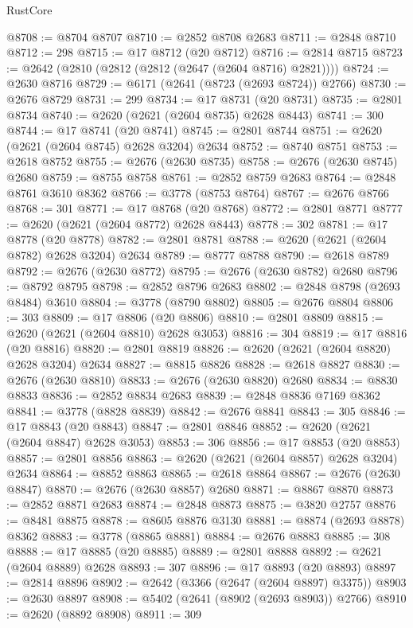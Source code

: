 \begin{lexlean}{RustCore}
\begin{coremodule}
@8708 := @8704 @8707
@8710 := @2852 @8708 @2683
@8711 := @2848 @8710
@8712 := 298
@8715 := @17 @8712 (@20 @8712)
@8716 := @2814 @8715
@8723 := @2642 (@2810 (@2812 (@2812 (@2647 (@2604 @8716) @2821))))
@8724 := @2630 @8716
@8729 := @6171 (@2641 (@8723 (@2693 @8724)) @2766)
@8730 := @2676 @8729
@8731 := 299
@8734 := @17 @8731 (@20 @8731)
@8735 := @2801 @8734
@8740 := @2620 (@2621 (@2604 @8735) @2628 @8443)
@8741 := 300
@8744 := @17 @8741 (@20 @8741)
@8745 := @2801 @8744
@8751 := @2620 (@2621 (@2604 @8745) @2628 @3204) @2634
@8752 := @8740 @8751
@8753 := @2618 @8752
@8755 := @2676 (@2630 @8735)
@8758 := @2676 (@2630 @8745) @2680
@8759 := @8755 @8758
@8761 := @2852 @8759 @2683
@8764 := @2848 @8761 @3610 @8362
@8766 := @3778 (@8753 @8764)
@8767 := @2676 @8766
@8768 := 301
@8771 := @17 @8768 (@20 @8768)
@8772 := @2801 @8771
@8777 := @2620 (@2621 (@2604 @8772) @2628 @8443)
@8778 := 302
@8781 := @17 @8778 (@20 @8778)
@8782 := @2801 @8781
@8788 := @2620 (@2621 (@2604 @8782) @2628 @3204) @2634
@8789 := @8777 @8788
@8790 := @2618 @8789
@8792 := @2676 (@2630 @8772)
@8795 := @2676 (@2630 @8782) @2680
@8796 := @8792 @8795
@8798 := @2852 @8796 @2683
@8802 := @2848 @8798 (@2693 @8484) @3610
@8804 := @3778 (@8790 @8802)
@8805 := @2676 @8804
@8806 := 303
@8809 := @17 @8806 (@20 @8806)
@8810 := @2801 @8809
@8815 := @2620 (@2621 (@2604 @8810) @2628 @3053)
@8816 := 304
@8819 := @17 @8816 (@20 @8816)
@8820 := @2801 @8819
@8826 := @2620 (@2621 (@2604 @8820) @2628 @3204) @2634
@8827 := @8815 @8826
@8828 := @2618 @8827
@8830 := @2676 (@2630 @8810)
@8833 := @2676 (@2630 @8820) @2680
@8834 := @8830 @8833
@8836 := @2852 @8834 @2683
@8839 := @2848 @8836 @7169 @8362
@8841 := @3778 (@8828 @8839)
@8842 := @2676 @8841
@8843 := 305
@8846 := @17 @8843 (@20 @8843)
@8847 := @2801 @8846
@8852 := @2620 (@2621 (@2604 @8847) @2628 @3053)
@8853 := 306
@8856 := @17 @8853 (@20 @8853)
@8857 := @2801 @8856
@8863 := @2620 (@2621 (@2604 @8857) @2628 @3204) @2634
@8864 := @8852 @8863
@8865 := @2618 @8864
@8867 := @2676 (@2630 @8847)
@8870 := @2676 (@2630 @8857) @2680
@8871 := @8867 @8870
@8873 := @2852 @8871 @2683
@8874 := @2848 @8873
@8875 := @3820 @2757
@8876 := @8481 @8875
@8878 := @8605 @8876 @3130
@8881 := @8874 (@2693 @8878) @8362
@8883 := @3778 (@8865 @8881)
@8884 := @2676 @8883
@8885 := 308
@8888 := @17 @8885 (@20 @8885)
@8889 := @2801 @8888
@8892 := @2621 (@2604 @8889) @2628
@8893 := 307
@8896 := @17 @8893 (@20 @8893)
@8897 := @2814 @8896
@8902 := @2642 (@3366 (@2647 (@2604 @8897) @3375))
@8903 := @2630 @8897
@8908 := @5402 (@2641 (@8902 (@2693 @8903)) @2766)
@8910 := @2620 (@8892 @8908)
@8911 := 309

\end{coremodule}
\end{lexlean}
